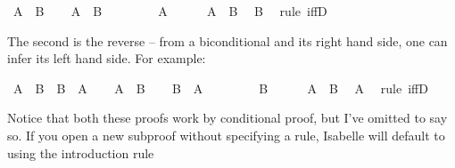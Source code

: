\begin{isabellebody}
\ {\isachardoublequoteopen}A\ {\isasymlongleftrightarrow}\ B{\isachardoublequoteclose}\isanewline
\ \ \isamarkupfalse%
\ {\isachardoublequoteopen}A\ {\isasymlongrightarrow}\ B{\isachardoublequoteclose}\isanewline
\ \ \isamarkupfalse%
\isanewline
\ \ \ \ \isamarkupfalse%
\ {\isachardoublequoteopen}A{\isachardoublequoteclose}\isanewline
\ \ \ \ \isamarkupfalse%
\ {\isacharbackquoteopen}A\ {\isasymlongleftrightarrow}\ B{\isacharbackquoteclose}\ \isamarkupfalse%
\ {\isachardoublequoteopen}B{\isachardoublequoteclose}\ \isamarkupfalse%
\ {\isacharparenleft}rule\ iffD{}{\isacharparenright}\isanewline
\ \ \isamarkupfalse%
\isanewline
{}\isamarkupfalse%
%
\endisatagproof
{\isafoldproof}%
%
\isadelimproof
%
\endisadelimproof
%
\begin{isamarkuptext}%
The second is the reverse -- from a biconditional and its right hand side, one can infer
its left hand side. For example:%
\end{isamarkuptext}\isamarkuptrue%
\isamarkupfalse%
\ {\isachardoublequoteopen}{\isacharparenleft}A\ {\isasymlongleftrightarrow}\ B{\isacharparenright}\ {\isasymlongrightarrow}\ B\ {\isasymlongrightarrow}\ A{\isachardoublequoteclose}\isanewline
%
\isadelimproof
%
\endisadelimproof
%
\isatagproof
{}\isamarkupfalse%
\isanewline
\ \ \isamarkupfalse%
\ {\isachardoublequoteopen}A\ {\isasymlongleftrightarrow}\ B{\isachardoublequoteclose}\isanewline
\ \ \isamarkupfalse%
\ {\isachardoublequoteopen}B\ {\isasymlongrightarrow}\ A{\isachardoublequoteclose}\isanewline
\ \ \isamarkupfalse%
\isanewline
\ \ \ \ \isamarkupfalse%
\ {\isachardoublequoteopen}B{\isachardoublequoteclose}\isanewline
\ \ \ \ \isamarkupfalse%
\ {\isacharbackquoteopen}A\ {\isasymlongleftrightarrow}\ B{\isacharbackquoteclose}\ \isamarkupfalse%
\ {\isachardoublequoteopen}A{\isachardoublequoteclose}\ \isamarkupfalse%
\ {\isacharparenleft}rule\ iffD{}{\isacharparenright}\isanewline
\ \ \isamarkupfalse%
\isanewline
{}\isamarkupfalse%
%
\endisatagproof
{\isafoldproof}%
%
\isadelimproof
%
\endisadelimproof
%
\begin{isamarkuptext}%
Notice that both these proofs work by conditional proof, but I've omitted to say so. If you
open a new subproof without specifying a rule, Isabelle will default to using the introduction rule

\end{isamarkuptext}
\end{isabellebody}
